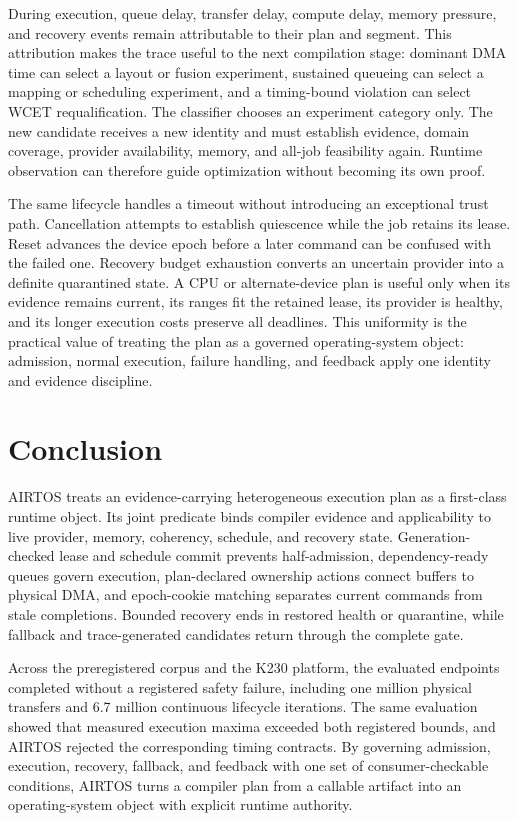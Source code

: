 \documentclass[lettersize,journal]{IEEEtran}
\begin{document}
During execution, queue delay, transfer delay, compute delay, memory pressure,
and recovery events remain attributable to their plan and segment. This
attribution makes the trace useful to the next compilation stage: dominant DMA
time can select a layout or fusion experiment, sustained queueing can select a
mapping or scheduling experiment, and a timing-bound violation can select WCET
requalification. The classifier chooses an experiment category only. The new
candidate receives a new identity and must establish evidence, domain coverage,
provider availability, memory, and all-job feasibility again. Runtime
observation can therefore guide optimization without becoming its own proof.

The same lifecycle handles a timeout without introducing an exceptional trust
path. Cancellation attempts to establish quiescence while the job retains its
lease. Reset advances the device epoch before a later command can be confused
with the failed one. Recovery budget exhaustion converts an uncertain provider
into a definite quarantined state. A CPU or alternate-device plan is useful
only when its evidence remains current, its ranges fit the retained lease, its
provider is healthy, and its longer execution costs preserve all deadlines.
This uniformity is the practical value of treating the plan as a governed
operating-system object: admission, normal execution, failure handling, and
feedback apply one identity and evidence discipline.

\section{Conclusion}
AIRTOS treats an evidence-carrying heterogeneous execution plan as a
first-class runtime object. Its joint predicate binds compiler evidence and
applicability to live provider, memory, coherency, schedule, and recovery
state. Generation-checked lease and schedule commit prevents half-admission,
dependency-ready queues govern execution, plan-declared ownership actions
connect buffers to physical DMA, and epoch-cookie matching separates current
commands from stale completions. Bounded recovery ends in restored health or
quarantine, while fallback and trace-generated candidates return through the
complete gate.

Across the preregistered corpus and the K230 platform, the evaluated endpoints
completed without a registered safety failure, including one million physical
transfers and 6.7 million continuous lifecycle iterations. The same evaluation
showed that measured execution maxima exceeded both registered bounds, and
AIRTOS rejected the corresponding timing contracts. By governing admission,
execution, recovery, fallback, and feedback with one set of consumer-checkable
conditions, AIRTOS turns a compiler plan from a callable artifact into an
operating-system object with explicit runtime authority.
\end{document}
